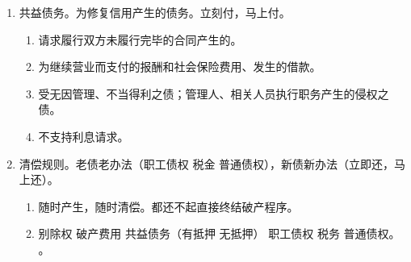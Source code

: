 \begin{enumerate}
\begin{enumerate}
          \item 管理人产生的费用，应得报酬。
          \item 聘用工作人员费用。
        \end{enumerate}
  \item 共益债务。为修复信用产生的债务。立刻付，马上付。
        \begin{enumerate}
          \item 请求履行双方未履行完毕的合同产生的。
          \item 为继续营业而支付的报酬和社会保险费用、发生的借款。
          \item 受无因管理、不当得利之债；管理人、相关人员执行职务产生的侵权之债。
          \item 不支持利息请求。
        \end{enumerate}
  \item 清偿规则。老债老办法（职工债权 \dy 税金 \dy 普通债权），新债新办法（立即还，马上还）。
        \begin{enumerate}
          \item 随时产生，随时清偿。都还不起直接终结破产程序。
          \item 别除权 \dy 破产费用 \dy 共益债务（有抵押 \dy 无抵押） \dy 职工债权 \dy 税务 \dy 普通债权。
                。
        \end{enumerate}
\end{enumerate}
